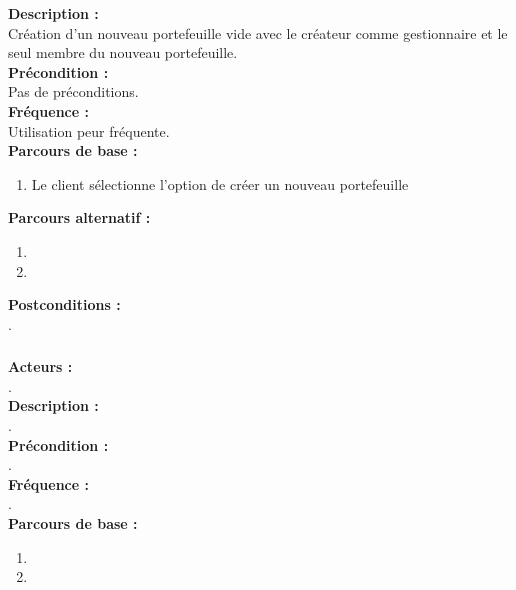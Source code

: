 \documentclass[../rapport.tex]{subfiles}
\begin{document}
\textbf{Description :} \\
Création d'un nouveau portefeuille vide avec le créateur comme gestionnaire et le seul membre du nouveau portefeuille. \\

\textbf{Précondition :} \\
Pas de préconditions. \\

\textbf{Fréquence :} \\
Utilisation peur fréquente. \\

\textbf{Parcours de base :} \\
\begin{enumerate}
    \item Le client sélectionne l'option de créer un nouveau portefeuille
\end{enumerate}
\bigskip

\textbf{Parcours alternatif :}
\begin{enumerate}
    \item 
    \item 
\end{enumerate}

\textbf{Postconditions :} \\
. \\



\subsubsection{}

\textbf{Acteurs :} \\
. \\

\textbf{Description :} \\
. \\

\textbf{Précondition :} \\
. \\

\textbf{Fréquence :} \\
. \\

\textbf{Parcours de base :} \\
\begin{enumerate}
    \item 
    \item 
\end{enumerate}
\bigskip
\end{document}
